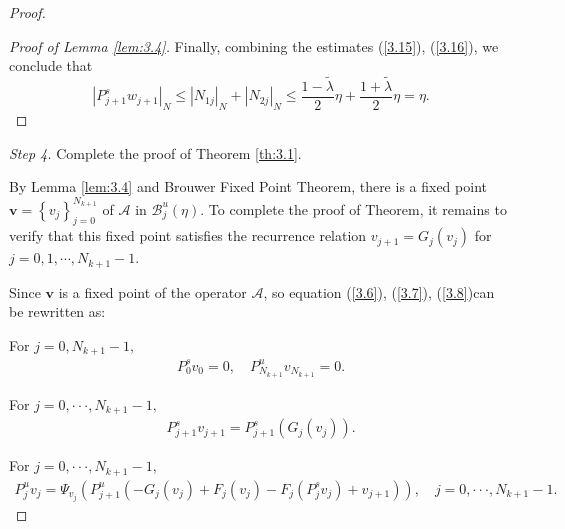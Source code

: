 \documentclass[12pt]{article}
\begin{document}
\begin{proof}
\begin{proof}[Proof of Lemma \ref{lem:3.4}]
		Finally, combining the estimates (\ref{3.15}), (\ref{3.16}), we conclude that
		$$
		|P_{j+1}^{s}w_{j+1}|_{N}\leqslant |N_{1j}|_{N}+|N_{2j}|_{N}\leqslant\frac{1-\widetilde\lambda}{2}\eta+\frac{1+\widetilde\lambda}{2}  \eta=\eta.
		$$
	\end{proof}
	{\em Step 4.} Complete the proof of
	Theorem \ref{th:3.1}. 
	
	By Lemma \ref{lem:3.4} and Brouwer Fixed Point Theorem, there is a fixed point $ \boldsymbol{v}=\left\{v_j\right\}_{j=0}^{N_{k+1}} $ of $ \mathcal{A} $ in $ \mathcal{B}_{j}^{u}(\eta) $. To complete the proof of Theorem, it remains to verify that this fixed point satisfies the recurrence relation  $ v_{j+1}=G_{j}(v_{j}) $ for $ j=0,1,\cdots,N_{k+1}-1. $
	
	Since $ \boldsymbol{v} $ is a fixed point of the operator $ \mathcal{A} $, so equation (\ref{3.6}), (\ref{3.7}), (\ref{3.8})can be rewritten as:
	
	For $ j=0,N_{k+1}-1, $
	\begin{align}\label{3.17}
		P_0^{s}v_{0}=0, \quad
		P_{N_{k+1}}^{u}v_{N_{k+1}}=0.
	\end{align}
	
	For $ j=0,\cdot\cdot\cdot,N_{k+1}-1, $
	\begin{align}\label{3.18}
		P_{j+1}^{s}v_{j+1}=P_{j+1}^{s}(G_{j}(v_{j})).
	\end{align}
	
	For $ j=0,\cdot\cdot\cdot,N_{k+1}-1,$
	\begin{align}\label{3.19}
		P_{j}^{u}v_{j}=\Psi_{v_{j}}(P_{j+1}^{u}(-G_{j}(v_{j})+F_{j}(v_{j})-F_{j}(P_{j}^{s}v_{j})+v_{j+1})), \quad j=0,\cdot\cdot\cdot,N_{k+1}-1.
	\end{align}
	

\end{proof}
\end{document}
